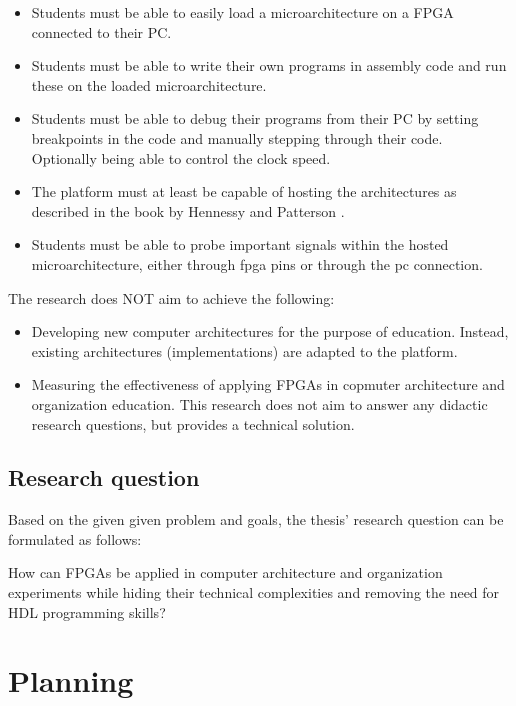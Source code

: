 \documentclass[singleside,openright]{uva-bachelor-thesis}
\begin{document}
\begin{itemize}
\item Students must be able to easily load a microarchitecture on a FPGA connected to their PC.
\item Students must be able to write their own programs in assembly code and run these on the loaded microarchitecture.
\item Students must be able to debug their programs from their PC by setting breakpoints in the code and manually stepping through their code. Optionally being able to control the clock speed.
\item The platform must at least be capable of hosting the architectures as described in the book by Hennessy and Patterson \cite{hennessyPatterson}.
\item Students must be able to probe important signals within the hosted microarchitecture, either through fpga pins or through the pc connection.
\end{itemize}


The research does NOT aim to achieve the following:
\begin{itemize}
\item Developing new computer architectures for the purpose of education. Instead, existing architectures (implementations) are adapted to the platform.
\item Measuring the effectiveness of applying FPGAs in copmuter architecture and organization education. This research does not aim to answer any didactic research questions, but provides a technical solution.
\end{itemize}

\section{Research question}

Based on the given given problem and goals, the thesis' research question can be formulated as follows:

\begin{displayquote}
How can FPGAs be applied in computer architecture and organization experiments while hiding their technical complexities and removing the need for HDL programming skills?
\end{displayquote}



\chapter{Planning}
\end{document}
